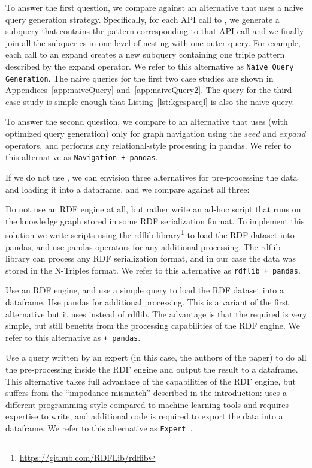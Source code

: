 To answer the first question, we compare \rdfframes against an alternative that 
uses a naive query generation strategy. Specifically, for each API call to \rdfframes, we generate a subquery that contains the pattern corresponding to that API call and we finally join all the subqueries in one level of nesting with one outer query. For example, each call to an expand creates a new subquery containing one triple pattern described by the expand operator.
We refer to this alternative as \texttt{Naive Query Generation}.
The naive queries for the first two case studies are shown in Appendices~\ref{app:naiveQuery} and~\ref{app:naiveQuery2}. The \sparql query for the third case study is simple enough that Listing~\ref{lst:kgesparql} is also the naive query.

To answer the second question, 
we compare to an alternative that uses \rdfframes (with optimized query generation) only for graph navigation using the $seed$ and $expand$ operators,
and performs any relational-style processing in pandas. We refer to this alternative as
\texttt{Navigation + pandas}.

If we do not use \rdfframes, we can envision three alternatives for pre-processing the data and loading it into a dataframe, and we compare against all three:
\squishlist
\item
Do not use an RDF engine at all, but rather write an ad-hoc script that runs on the knowledge graph stored in some RDF serialization format.
To implement this solution we write scripts using the rdflib library\footnote{\url{https://github.com/RDFLib/rdflib}} to load the RDF dataset into pandas, and use pandas operators for any additional processing.
The rdflib library can process any RDF serialization format, and in our case the data was stored in the N-Triples format. We refer to this alternative as \texttt{rdflib + pandas}.

\item
Use an RDF engine, and use a simple \sparql query to load the RDF dataset into a dataframe. Use pandas for additional processing.
This is a variant of the first alternative but it uses \sparql instead of rdflib.
The advantage is that the required \sparql is very simple, but still
benefits from 
the processing capabilities of the RDF engine.
We refer to this alternative as \texttt{\sparql + pandas}.

\item
Use a \sparql query written by an expert (in this case, the authors of the paper) to do all the pre-processing inside the RDF engine and output the result to a dataframe.
This alternative takes full advantage of the capabilities of the RDF engine, but suffers from the ``impedance mismatch'' described in the introduction: \sparql uses a different programming style compared to machine learning tools and requires expertise to write,
and additional code is required to export the data into a dataframe.
We refer to this alternative as \texttt{Expert \sparql}.

